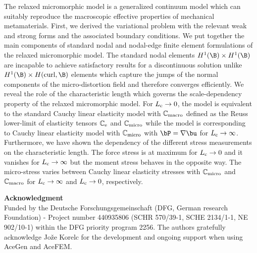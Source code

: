 \label{sec:con}
The relaxed  micromorphic model is a generalized continuum model which can suitably reproduce the macroscopic effective  properties of mechanical metamaterials.  First,  we derived the variational problem with the relevant weak and strong forms and the associated boundary conditions.  We put together the main components of  standard nodal and nodal-edge finite element formulations of the relaxed micromorphic model.  The standard nodal elements $H^1(\B) \times H^1(\B)$ are incapable to achieve satisfactory results for a discontinuous solution unlike $H^1(\B) \times H(\curl, \B)$ elements which capture the jumps of the normal components of the micro-distortion field and therefore converges   efficiently. We reveal the role of the characteristic length which governs the scale-dependency property of the relaxed micromorphic model. For $L_{\mathrm{c}}  \rightarrow 0$, the model is equivalent to the standard Cauchy linear elasticity model with $\mathbb{C}_{\mathrm{macro}}$ defined as the Reuss lower-limit of elasticity tensors $\mathbb{C}_{\mathrm{e}}$ and $\mathbb{C}_{\mathrm{micro}}$ while the model is corresponding to  Cauchy linear elasticity model with $\mathbb{C}_{\mathrm{micro}}$ with $\Bdis = \nabla \bu$ for  $L_{\mathrm{c}}  \rightarrow \infty$.  Furthermore, we have shown the dependency of the different stress measurements  on the characteristic length.  The force stress is at maximum for $L_{\mathrm{c}}  \rightarrow 0$  and it vanishes for  $L_{\mathrm{c}}  \rightarrow \infty$ but the moment stress behaves in the opposite way. The micro-stress varies between Cauchy linear elasticity stresses with  $\mathbb{C}_{\mathrm{micro}}$  and $\mathbb{C}_{\mathrm{macro}}$ for   $L_{\mathrm{c}}  \rightarrow \infty$ and  $L_{\mathrm{c}}  \rightarrow 0$, respectively. 
 
\vspace{2 cm}

{\bf Acknowledgment} \\
Funded by the Deutsche Forschungsgemeinschaft (DFG, German research Foundation) -  Project number 440935806 (SCHR 570/39-1, SCHE 2134/1-1, NE 902/10-1) within the DFG priority program 2256. The authors gratefully acknowledge Jo\v{z}e Korelc for the development and ongoing support when using AceGen and AceFEM.




 
